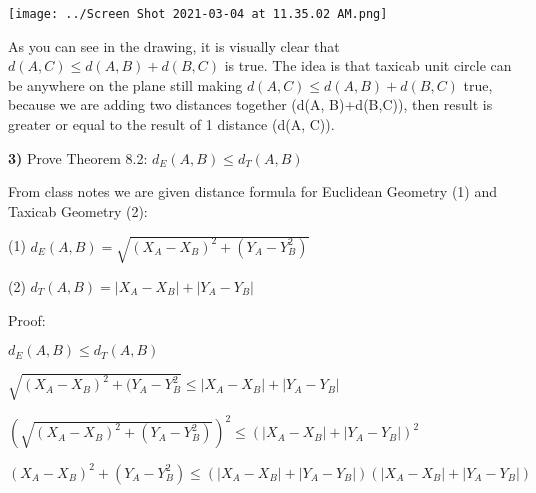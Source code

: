 \documentclass{article}
\begin{document}
\vspace{2mm}

\texttt{[image: ../Screen Shot 2021-03-04 at 11.35.02 AM.png]}

As you can see in the drawing, it is visually clear that $d(A, C) \le d(A, B)+d(B,C) $ is true. The idea is that taxicab unit circle can be anywhere on the plane still making $d(A, C) \le d(A, B)+d(B,C)$ true, because we are adding two distances together (d(A, B)+d(B,C)), then result is greater or equal to the result of 1 distance (d(A, C)).







 








\newpage


\textbf{3)} Prove Theorem 8.2: $ d_{E}(A,B) \le d_{T} (A,B)$

\vspace{2mm}

From class notes we are given distance formula for Euclidean Geometry (1) and Taxicab Geometry (2):

\vspace{2mm}

(1) $  d_{E}(A,B)=\sqrt{(X_{A}-X_{B})^{2} + (Y_{A}-Y_{B}^{2})}$

\vspace{2mm}

(2) $  d_{T} (A,B)=|X_{A}-X_{B}| + |Y_{A}-Y_{B}|$

Proof:

$ d_{E}(A,B) \le d_{T} (A,B)$

\vspace{2mm}

$\sqrt{(X_{A}-X_{B})^{2} + (Y_{A}-Y_{B}^{2}} \le |X_{A}-X_{B}| + |Y_{A}-Y_{B}|$

\vspace{2mm}

$ (\sqrt{(X_{A}-X_{B})^{2} + (Y_{A}-Y_{B}^{2})})^{2} \le (|X_{A}-X_{B}| + |Y_{A}-Y_{B}|)^{2}$

\vspace{2mm}

$(X_{A}-X_{B})^{2} + (Y_{A}-Y_{B}^{2}) \le (|X_{A}-X_{B}| + |Y_{A}-Y_{B}|)(|X_{A}-X_{B}| + |Y_{A}-Y_{B}|)$

\vspace{2mm}
\end{document}
